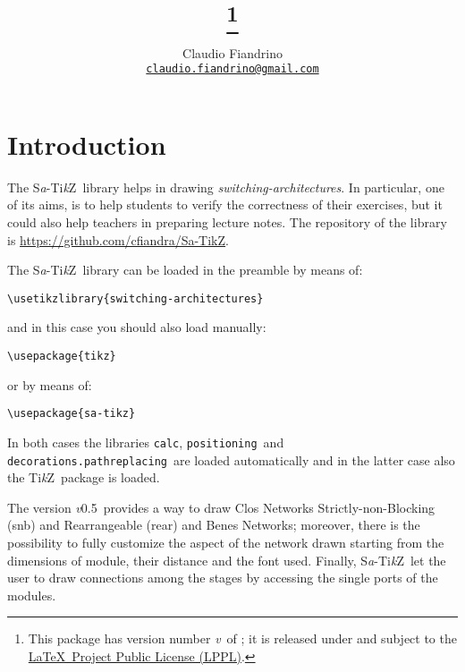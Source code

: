\documentclass{ltxdoc}
\title{\saTikZ\footnote{This package has version number \textit{v}\version\ of \versiondate; it is released under and subject to the \href{http://www.latex-project.org/lppl/}{\LaTeX\ Project Public License (LPPL)}.}}
\author{Claudio Fiandrino \\ \small\href{mailto:claudio.fiandrino@gmail.com}{\texttt{claudio.fiandrino@gmail.com}}}
\date{\versiondate}
\newcommand\Tikz{Ti\textit kZ}
\newcommand{\saTikZ}{S\textit{a}-\Tikz}
\newcommand{\version}{0.5}
\begin{document}
\maketitle
\tableofcontents

\section*{Introduction}
The \saTikZ\ library helps in drawing \emph{switching-architectures}. In particular, one of its aims, is to help students to verify the correctness of their exercises, but it could also help teachers in preparing lecture notes. The repository of the library is \href{https://github.com/cfiandra/Sa-TikZ}{https://github.com/cfiandra/Sa-TikZ}.

The \saTikZ\ library can be loaded in the preamble by means of:
\begin{flushleft}
\verb|\usetikzlibrary{|\bgroup\color{red!75!black}\verb|switching-architectures|\egroup\verb|}|
\end{flushleft}
and in this case you should also load manually:
\begin{flushleft}
\verb|\usepackage{|\bgroup\color{red!75!black}\verb|tikz|\egroup\verb|}|
\end{flushleft}
or by means of:
\begin{flushleft}
\verb|\usepackage{|\bgroup\color{red!75!black}\verb|sa-tikz|\egroup\verb|}|
\end{flushleft}
In both cases the libraries \bgroup\color{red!75!black}\verb|calc|\egroup{}, \bgroup\color{red!75!black}\verb|positioning|\egroup\ and \bgroup\color{red!75!black}\verb|decorations.pathreplacing|\egroup\ are loaded automatically and in the latter case also the \Tikz\ package is loaded.

The version \textit{v}\version\ provides a way to draw Clos Networks Strictly-non-Blocking (snb) and Rearrangeable (rear) and Benes Networks; moreover, there is the possibility to fully customize the aspect of the network drawn starting from the dimensions of module, their distance and the font used. Finally, \saTikZ\ let the user to draw connections among the stages by accessing the single ports of the modules.
\end{document}

